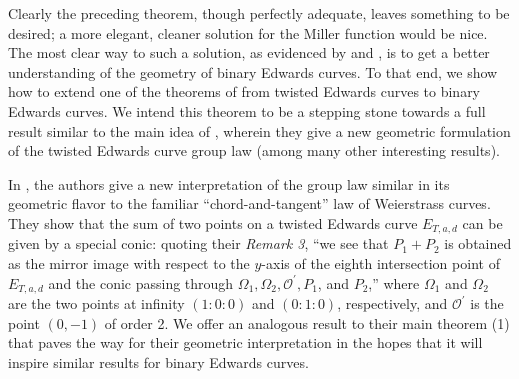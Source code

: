 
Clearly the preceding theorem, though perfectly adequate, leaves something to
    be desired; a more elegant, cleaner solution for the Miller function would
    be nice.
The most clear way to such a solution, as evidenced by \cite{arene2011faster}
    and \cite{lipairing}, is to get a better understanding of the geometry of
    binary Edwards curves.
To that end, we show how to extend one of the theorems of
    \cite{arene2011faster} from twisted Edwards curves to binary Edwards
    curves.
We intend this theorem to be a stepping stone towards a full result similar to
    the main idea of \cite{arene2011faster}, wherein they give a new geometric
    formulation of the twisted Edwards curve group law (among many other
    interesting results).

In \cite{arene2011faster}, the authors give a new interpretation of the group
    law similar in its geometric flavor to the familiar ``chord-and-tangent''
    law of Weierstrass curves.
They show that the sum of two points on a twisted Edwards curve $E_{T, a, d}$
    can be given by a special conic: quoting their \textit{Remark 3}, ``we see
    that $P_1 + P_2$ is obtained as the mirror image with respect to the
    $y$-axis of the eighth intersection point of $E_{T, a,d}$ and the conic
    passing through $\Omega_1, \Omega_2, \mathcal{O}^\prime, P_1$, and $P_2$,''
    where $\Omega_1$ and $\Omega_2$ are the two points at infinity $(1 : 0 :
    0)$ and $(0 : 1 : 0)$, respectively, and $\mathcal{O}^\prime$ is the point
    $(0, -1)$ of order 2.
We offer an analogous result to their main theorem (1) that paves the way for
    their geometric interpretation in the hopes that it will inspire similar
    results for binary Edwards curves.


